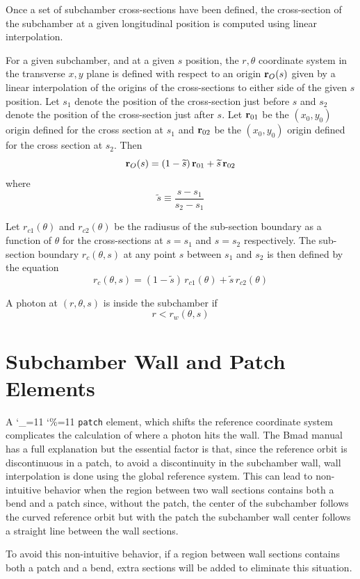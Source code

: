 \documentclass[11pt,openany]{report}
\newcommand\ttcmd{\begingroup\catcode`\_=11 \catcode`\%=11 \dottcmd}
\newcommand\dottcmd[1]{\texttt{#1}\endgroup}
\newcommand{\Begineq}{\begin{equation}}
\newcommand{\Endeq}{\end{equation}}
\newcommand{\vn}{\ttcmd}
\newcommand{\Bf}[1]{{\bf #1}}
\newcommand{\bfr}{\Bf r}
\newcommand{\stilde}{{\widetilde s}}
\begin{document}
Once a set of subchamber cross-sections have been defined, the
cross-section of the subchamber at a given longitudinal position is
computed using linear interpolation. 

For a given subchamber, and 
at a given $s$ position, the $r, \theta$ coordinate system in the
transverse $x, y$ plane is defined with respect to an origin
$\bfr_O(s)$ given by a linear interpolation of the origins of the
cross-sections to either side of the given $s$ position. Let $s_1$
denote the position of the cross-section just before $s$ and $s_2$
denote the position of the cross-section just after $s$. Let
$\bfr_{01}$ be the $(x_0, y_0)$ origin defined for the cross section
at $s_1$ and $\bfr_{02}$ be the $(x_0, y_0)$ origin defined for the
cross section at $s_2$. Then
\Begineq
  \bfr_O(s) = (1 - \stilde) \, \bfr_{01} + \stilde \, \bfr_{02}
\Endeq
where 
\Begineq
  \stilde \equiv \frac{s - s_1}{s_2 - s_1}
\Endeq

Let $r_{c1}(\theta)$ and $r_{c2}(\theta)$ be the radiusus of the
sub-section boundary as a function of $\theta$ for the cross-sections
at $s = s_1$ and $s = s_2$ respectively. The sub-section boundary
$r_c(\theta, s)$ at any point $s$ between $s_1$ and $s_2$ is then
defined by the equation
\Begineq
  r_c(\theta, s) = (1 - \stilde) \, r_{c1}(\theta) + \stilde \, r_{c2}(\theta)
\Endeq

A photon at $(r,\theta, s)$ is inside the subchamber if
\Begineq
  r < r_w(\theta, s)
\Endeq

\section{Subchamber Wall and Patch Elements}
\label{s:patch}

A \vn{patch} element, which shifts the reference coordinate system
complicates the calculation of where a photon hits the wall. The Bmad
manual has a full explanation but the essential factor is that, since
the reference orbit is discontinuous in a patch, to avoid a
discontinuity in the subchamber wall, wall interpolation is done using
the global reference system. This can lead to non-intuitive behavior
when the region between two wall sections contains both a bend and a
patch since, without the patch, the center of the subchamber follows the
curved reference orbit but with the patch the subchamber wall center
follows a straight line between the wall sections.

To avoid this non-intuitive behavior, if a region between wall sections
contains both a patch and a bend, extra sections will be added to
eliminate this situation.
\end{document}
